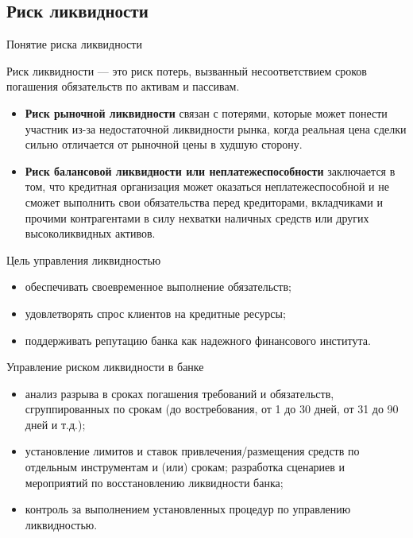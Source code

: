 \documentclass[financial_risks_lectures.tex]{subfiles}
\begin{document}
\subsection{Риск ликвидности}
\begin{frame}[shrink=15]{Понятие риска ликвидности}
\begin{block}{Риск ликвидности}
\quad — это риск потерь, вызванный несоответствием сроков погашения обязательств по активам и пассивам.
\end{block}

\begin{itemize}[<+->]
\item
\textbf{Риск рыночной ликвидности }связан с потерями, которые может понести участник из-за недостаточной ликвидности рынка, когда реальная цена сделки сильно отличается от рыночной цены в худшую сторону.
\item
\textbf{Риск балансовой ликвидности или неплатежеспособности }заключается в том, что кредитная организация может оказаться неплатежеспособной и не сможет выполнить свои обязательства перед кредиторами, вкладчиками и прочими контрагентами в силу нехватки наличных средств или других высоколиквидных активов.
\end{itemize}
\end{frame}

\begin{frame}{Цель управления ликвидностью}
\begin{itemize}[<+->]
\item
обеспечивать своевременное выполнение обязательств;
\item
удовлетворять спрос клиентов на кредитные ресурсы;
\item
поддерживать репутацию банка как надежного финансового института.
\end{itemize}
\end{frame}

\begin{frame}{Управление риском ликвидности в банке}
\begin{itemize}[<+->]
\item
анализ разрыва в сроках погашения требований и обязательств, сгруппированных по срокам (до востребования, от 1 до 30 дней, от 31 до 90 дней и т.д.);
\item
установление лимитов и ставок привлечения/размещения средств по отдельным инструментам и (или) срокам;
разработка сценариев и мероприятий по восстановлению ликвидности банка;
\item
контроль за выполнением установленных процедур по управлению ликвидностью.
\end{itemize}
\end{frame}
\end{document}
